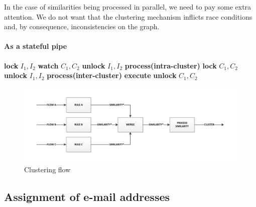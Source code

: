 In the case of similarities being processed in parallel, we need to pay some extra attention. We do not want that the clustering mechanism inflicts race conditions and, by consequence, inconsistencies on the graph.


\paragraph{As a stateful pipe}

\begin{algorithm}
\caption{!!!}
\label{mincutgusfield}
\begin{algorithmic}
\STATE \textbf{lock} $I_1,I_2$
  \STATE \textbf{watch} $C_1,C_2$
  \STATE \textbf{unlock} $I_1,I_2$
  \STATE \textbf{process(intra-cluster)}
\ELSE
  \STATE \textbf{lock} $C_1,C_2$
  \STATE \textbf{unlock} $I_1,I_2$
  \STATE \textbf{process(inter-cluster)}
  \STATE \textbf{execute}
  \STATE \textbf{unlock} $C_1,C_2$
\ENDIF
\end{algorithmic}
\end{algorithm}

\begin{figure}[htbp]
	\centering
		\includegraphics[width=1\textwidth]{fig/clusteringpipe}
	\caption{Clustering flow}
	\label{fig:clusteringpipe}
\end{figure}

\subsection{Assignment of e-mail addresses}